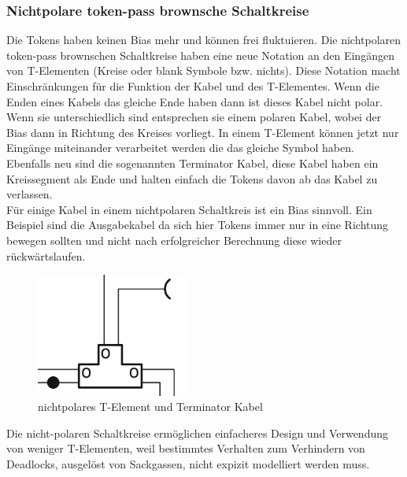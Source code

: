 \documentclass[11pt,a4paper]{article}
\begin{document}

\subsubsection{Nichtpolare token-pass brownsche Schaltkreise}
Die Tokens haben keinen Bias mehr und können frei fluktuieren.
%
Die nichtpolaren token-pass brownschen Schaltkreise haben eine neue Notation
an den Eingängen von T-Elementen (Kreise oder blank Symbole bzw. nichts).
%
Diese Notation macht Einschränkungen für die Funktion
der Kabel und des T-Elementes.
%
Wenn die Enden eines Kabels das gleiche Ende haben dann ist dieses Kabel nicht
polar. 
%
Wenn sie unterschiedlich sind entsprechen sie einem polaren Kabel, wobei 
der Bias dann in Richtung des Kreises vorliegt.
%
In einem T-Element können jetzt nur Eingänge miteinander verarbeitet werden
die das gleiche Symbol haben. \\
%
Ebenfalls neu sind die sogenannten Terminator Kabel, diese Kabel haben ein 
Kreissegment als Ende und halten einfach die Tokens 
davon ab das Kabel zu verlassen. \\
%
Für einige Kabel in einem nichtpolaren Schaltkreis ist ein Bias sinnvoll.
%
Ein Beispiel sind die Ausgabekabel da sich hier Tokens immer nur in eine 
Richtung bewegen sollten und nicht nach erfolgreicher Berechnung diese 
wieder rückwärtslaufen.

\begin{figure}[h]
    \centering
    \includegraphics[width=5cm]{bilder/NonPolarTerminator.png}
    \caption{nichtpolares T-Element und Terminator Kabel}
    \label{fig:T_Element}
\end{figure}

Die nicht-polaren Schaltkreise ermöglichen einfacheres Design und Verwendung
von weniger T-Elementen, weil bestimmtes Verhalten zum Verhindern von
Deadlocks, ausgelöst von Sackgassen, nicht expizit modelliert werden muss.


\end{document}
